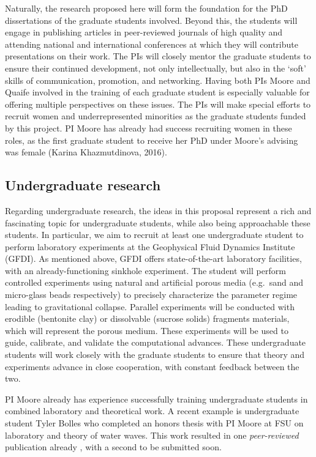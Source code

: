 \documentclass[11pt]{article}
\begin{document}
	Naturally, the research proposed here will form the foundation for the PhD dissertations of the graduate students involved. Beyond this, the students will engage in publishing articles in peer-reviewed journals of high quality and attending national and international conferences at which they will contribute presentations on their work. The PIs will closely mentor the graduate students to ensure their continued development, not only intellectually, but also in the `soft' skills of communication, promotion, and networking. Having both PIs Moore and Quaife involved in the training of each graduate student is especially valuable for offering multiple perspectives on these issues. The PIs will make special efforts to recruit women and underrepresented minorities as the graduate students funded by this project. PI Moore has already had success recruiting women in these roles, as the first graduate student to receive her PhD under Moore's advising was female (Karina Khazmutdinova, 2016).


\subsection{Undergraduate research}

	Regarding undergraduate research, the ideas in this proposal represent a rich and fascinating topic for undergraduate students, while also being approachable these students. In particular, we aim to recruit at least one undergraduate student to perform laboratory experiments at the Geophysical Fluid Dynamics Institute (GFDI). As mentioned above, GFDI offers state-of-the-art laboratory facilities, with an already-functioning sinkhole experiment. The student will perform controlled experiments using natural and artificial porous media (e.g.~sand and micro-glass beads respectively) to precisely characterize the parameter regime leading to gravitational collapse. Parallel experiments will be conducted with erodible (bentonite clay) or dissolvable  (sucrose solids) fragments materials, which will represent the porous medium. These experiments will be used to guide, calibrate, and validate the computational advances. These undergraduate students will work closely with the graduate students to ensure that theory and experiments advance in close cooperation, with constant feedback between the two.

	PI Moore already has experience successfully training undergraduate students in combined laboratory and theoretical work. A recent example is undergraduate student Tyler Bolles who completed an honors thesis with PI Moore at FSU on laboratory and theory of water waves. This work resulted in one {\em peer-reviewed} publication already \cite{Bolles2019}, with a second to be submitted soon.
\end{document}
